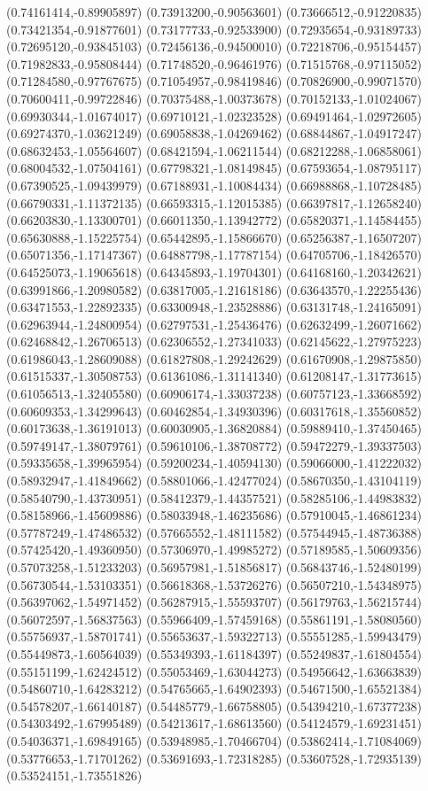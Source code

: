 (0.74161414,-0.89905897) (0.73913200,-0.90563601) (0.73666512,-0.91220835) (0.73421354,-0.91877601) (0.73177733,-0.92533900) (0.72935654,-0.93189733) (0.72695120,-0.93845103) (0.72456136,-0.94500010) (0.72218706,-0.95154457) (0.71982833,-0.95808444) (0.71748520,-0.96461976) (0.71515768,-0.97115052) (0.71284580,-0.97767675) (0.71054957,-0.98419846) (0.70826900,-0.99071570) (0.70600411,-0.99722846) (0.70375488,-1.00373678) (0.70152133,-1.01024067) (0.69930344,-1.01674017) (0.69710121,-1.02323528) (0.69491464,-1.02972605) (0.69274370,-1.03621249) (0.69058838,-1.04269462) (0.68844867,-1.04917247) (0.68632453,-1.05564607) (0.68421594,-1.06211544) (0.68212288,-1.06858061) (0.68004532,-1.07504161) (0.67798321,-1.08149845) (0.67593654,-1.08795117) (0.67390525,-1.09439979) (0.67188931,-1.10084434) (0.66988868,-1.10728485) (0.66790331,-1.11372135) (0.66593315,-1.12015385) (0.66397817,-1.12658240) (0.66203830,-1.13300701) (0.66011350,-1.13942772) (0.65820371,-1.14584455) (0.65630888,-1.15225754) (0.65442895,-1.15866670) (0.65256387,-1.16507207) (0.65071356,-1.17147367) (0.64887798,-1.17787154) (0.64705706,-1.18426570) (0.64525073,-1.19065618) (0.64345893,-1.19704301) (0.64168160,-1.20342621) (0.63991866,-1.20980582) (0.63817005,-1.21618186) (0.63643570,-1.22255436) (0.63471553,-1.22892335) (0.63300948,-1.23528886) (0.63131748,-1.24165091) (0.62963944,-1.24800954) (0.62797531,-1.25436476) (0.62632499,-1.26071662) (0.62468842,-1.26706513) (0.62306552,-1.27341033) (0.62145622,-1.27975223) (0.61986043,-1.28609088) (0.61827808,-1.29242629) (0.61670908,-1.29875850) (0.61515337,-1.30508753) (0.61361086,-1.31141340) (0.61208147,-1.31773615) (0.61056513,-1.32405580) (0.60906174,-1.33037238) (0.60757123,-1.33668592) (0.60609353,-1.34299643) (0.60462854,-1.34930396) (0.60317618,-1.35560852) (0.60173638,-1.36191013) (0.60030905,-1.36820884) (0.59889410,-1.37450465) (0.59749147,-1.38079761) (0.59610106,-1.38708772) (0.59472279,-1.39337503) (0.59335658,-1.39965954) (0.59200234,-1.40594130) (0.59066000,-1.41222032) (0.58932947,-1.41849662) (0.58801066,-1.42477024) (0.58670350,-1.43104119) (0.58540790,-1.43730951) (0.58412379,-1.44357521) (0.58285106,-1.44983832) (0.58158966,-1.45609886) (0.58033948,-1.46235686) (0.57910045,-1.46861234) (0.57787249,-1.47486532) (0.57665552,-1.48111582) (0.57544945,-1.48736388) (0.57425420,-1.49360950) (0.57306970,-1.49985272) (0.57189585,-1.50609356) (0.57073258,-1.51233203) (0.56957981,-1.51856817) (0.56843746,-1.52480199) (0.56730544,-1.53103351) (0.56618368,-1.53726276) (0.56507210,-1.54348975) (0.56397062,-1.54971452) (0.56287915,-1.55593707) (0.56179763,-1.56215744) (0.56072597,-1.56837563) (0.55966409,-1.57459168) (0.55861191,-1.58080560) (0.55756937,-1.58701741) (0.55653637,-1.59322713) (0.55551285,-1.59943479) (0.55449873,-1.60564039) (0.55349393,-1.61184397) (0.55249837,-1.61804554) (0.55151199,-1.62424512) (0.55053469,-1.63044273) (0.54956642,-1.63663839) (0.54860710,-1.64283212) (0.54765665,-1.64902393) (0.54671500,-1.65521384) (0.54578207,-1.66140187) (0.54485779,-1.66758805) (0.54394210,-1.67377238) (0.54303492,-1.67995489) (0.54213617,-1.68613560) (0.54124579,-1.69231451) (0.54036371,-1.69849165) (0.53948985,-1.70466704) (0.53862414,-1.71084069) (0.53776653,-1.71701262) (0.53691693,-1.72318285) (0.53607528,-1.72935139) (0.53524151,-1.73551826) 